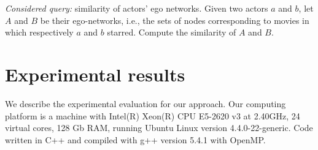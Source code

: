     \textsl{Considered query:} similarity of actors' ego networks. Given two actors $a$ and $b$, let $A$ and $B$ be their ego-networks, i.e., the sets of nodes corresponding to movies in which respectively $a$ and $b$ starred. Compute the similarity of $A$ and $B$.


    
    \section{Experimental results}

    We describe the experimental evaluation for our approach. Our computing platform is a machine with Intel(R) Xeon(R) CPU E5-2620 v3 at 2.40GHz, 24 virtual cores, 128 Gb RAM, running Ubuntu Linux version 4.4.0-22-generic. Code written in C++ and compiled with g++ version 5.4.1 with OpenMP. 
    
